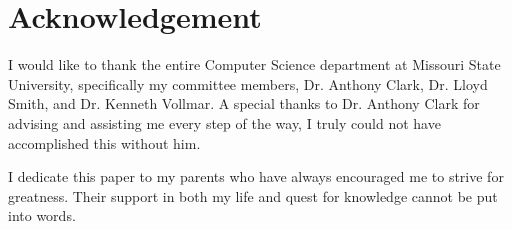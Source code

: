 

\section{Acknowledgement}
I would like to thank the entire Computer Science department at Missouri State University, specifically my committee members, Dr. Anthony Clark, Dr. Lloyd Smith, and Dr. Kenneth Vollmar.
A special thanks to Dr. Anthony Clark for advising and assisting me every step of the way, I truly could not have accomplished this without him.

I dedicate this paper to my parents who have always encouraged me to strive for greatness.
Their support in both my life and quest for knowledge cannot be put into words.
